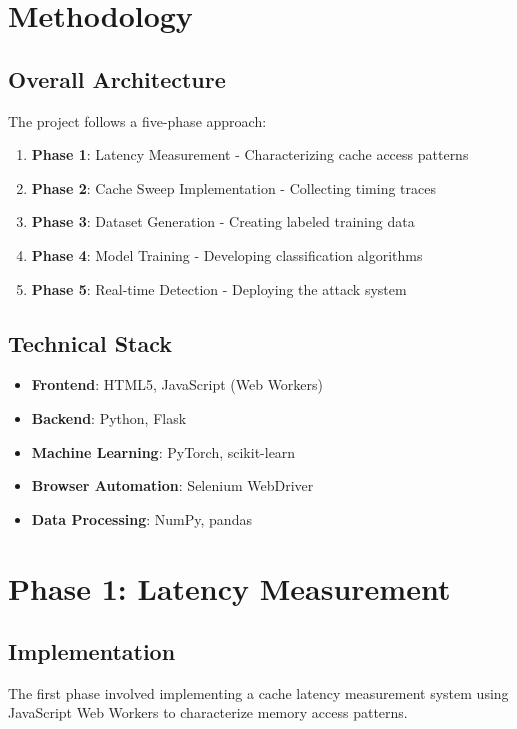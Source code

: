 \documentclass[11pt,a4paper]{article}
\begin{document}
\section{Methodology}

\subsection{Overall Architecture}
The project follows a five-phase approach:

\begin{enumerate}
    \item \textbf{Phase 1}: Latency Measurement - Characterizing cache access patterns
    \item \textbf{Phase 2}: Cache Sweep Implementation - Collecting timing traces
    \item \textbf{Phase 3}: Dataset Generation - Creating labeled training data
    \item \textbf{Phase 4}: Model Training - Developing classification algorithms
    \item \textbf{Phase 5}: Real-time Detection - Deploying the attack system
\end{enumerate}

\subsection{Technical Stack}
\begin{itemize}
    \item \textbf{Frontend}: HTML5, JavaScript (Web Workers)
    \item \textbf{Backend}: Python, Flask
    \item \textbf{Machine Learning}: PyTorch, scikit-learn
    \item \textbf{Browser Automation}: Selenium WebDriver
    \item \textbf{Data Processing}: NumPy, pandas
\end{itemize}

\section{Phase 1: Latency Measurement}

\subsection{Implementation}
The first phase involved implementing a cache latency measurement system using JavaScript Web Workers to characterize memory access patterns.
\end{document}

